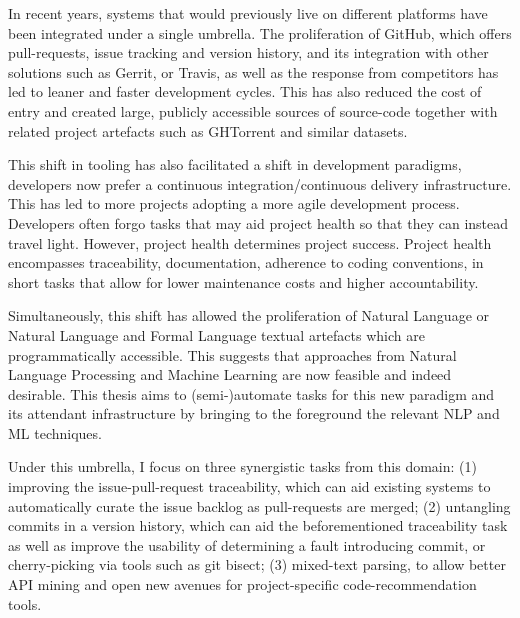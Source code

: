In recent years, systems that would previously live on different platforms have
been integrated under a single umbrella. The proliferation of GitHub, which
offers pull-requests, issue tracking and version history, and its integration
with other solutions such as Gerrit, or Travis, as well as the response from
competitors has led to leaner and faster development cycles. This has also
reduced the cost of entry and created large, publicly accessible sources of
source-code together with related project artefacts such as GHTorrent and
similar datasets.

This shift in tooling has also facilitated a shift in development paradigms,
developers now prefer a continuous integration/continuous delivery
infrastructure. This has led to more projects adopting a more agile development
process. Developers often forgo tasks that may aid project health so that they
can instead travel light. However, project health determines project success.
Project health encompasses traceability, documentation, adherence to coding
conventions, in short tasks that allow for lower maintenance costs and higher
accountability.

Simultaneously, this shift has allowed the proliferation of Natural Language or
Natural Language and Formal Language textual artefacts which are
programmatically accessible. This suggests that approaches from Natural Language
Processing and Machine Learning are now feasible and indeed desirable. This
thesis aims to (semi-)automate tasks for this new paradigm and its attendant
infrastructure by bringing to the foreground the relevant NLP and ML techniques.

Under this umbrella, I focus on three synergistic tasks from this domain: (1)
improving the issue-pull-request traceability, which can aid existing systems to
automatically curate the issue backlog as pull-requests are merged; (2)
untangling commits in a version history, which can aid the beforementioned
traceability task as well as improve the usability of determining a fault
introducing commit, or cherry-picking via tools such as git bisect; (3)
mixed-text parsing, to allow better API mining and open new avenues for
project-specific code-recommendation tools.